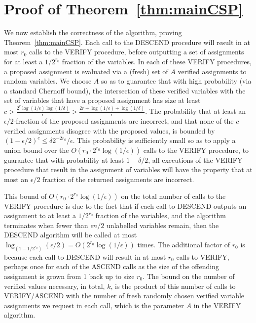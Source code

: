 \documentclass[anon,12pt]{colt2018}
\newcommand{\eps}{\epsilon}
\begin{document}
\iffalse

\section{Proof of Theorem~\ref{thm:mainCSP}}

We now establish the correctness of the algorithm, proving Theorem~\ref{thm:mainCSP}.    Each call to the DESCEND procedure will result in at most $r_0$ calls to the VERIFY procedure, before outputting a set of assignments for at least a $1/2^{r_0}$ fraction of the variables.   In each of these VERIFY procedures, a proposed assignment is evaluated via a (fresh) set of $A$ verified assignments to random variables.   We choose $A$ so as to guarantee that with high probability (via a standard Chernoff bound), the intersection of these verified variables with the set of variables that have a proposed assignment has size at least $c > \frac{2^r\log(1/\eps)\log(1/\delta)}{\eps}>\frac{2r+\log(1/\eps)+\log(1/\delta)}{\eps}$.   The probability that at least an $\eps/2$-fraction of the proposed assignments are incorrect, and that none of the $c$ verified assignments disagree with the proposed values, is bounded by $(1-\eps/2)^c \le \delta 2^{-2r_0}/\eps.$ This probability is sufficiently small so as to apply a union bound over the $O(r_0\cdot 2^{r_0}\log(1/\eps))$ calls to the VERIFY procedure, to guarantee that with probability at  least $1-\delta/2$, all executions of the VERIFY procedure that result in the assignment of variables will have the property that at most an $\eps/2$ fraction of the returned assignments are incorrect.    

This bound of $O(r_0\cdot 2^{r_0}\log(1/\eps))$ on the total number of calls to the VERIFY procedure is due to the fact that if each call to DESCEND outputs an assignment to at least a $1/2^{r_0}$ fraction of the variables, and the algorithm terminates when fewer than $\eps n /2$ unlabelled variables remain, then the DESCEND algorithm will be called at most $\log_{(1-1/2^{r_0})} (\eps/2) = O(2^{r_0} \log(1/\eps))$ times.  The additional factor of $r_0$ is because each call to DESCEND will result in at most $r_0$ calls to VERIFY, perhaps once for each of the ASCEND calls as the size of the offending assignment is grown from 1 back up to size $r_0$.   The bound on the number of verified values necessary, in total, $k$, is the product of this number of calls to VERIFY/ASCEND with the number of fresh randomly chosen verified variable assignments we request in each call, which is the parameter $A$ in the VERIFY algorithm.
\end{document}
